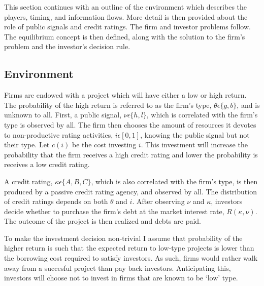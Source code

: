 \documentclass[notitlepage]{article}
\begin{document}
This section continues with an outline of the environment which describes the players, timing, and information flows. More detail is then provided about the role of public signals and credit ratings. The firm and investor problems follow. The equilibrium concept is then defined, along with the solution to the firm's problem and the investor's decision rule.

\subsection{Environment}
Firms are endowed with a project which will have either a low or high return. The probability of the high return is referred to as the firm's type, $\theta \epsilon \{g,b\}$, and is unknown to all. First, a public signal, $\nu \epsilon \{h,l\}$, which is correlated with the firm's type is observed by all. The firm then chooses the amount of resources it devotes to non-productive rating activities, $i  \epsilon [0,1]$, knowing the public signal but not their type. Let $c(i)$ be the cost investing $i$. This investment will increase the probability that the firm receives a high credit rating and lower the probability is receives a low credit rating.

A credit rating, $\kappa \epsilon \{A,B,C\}$, which is also correlated with the firm's type, is then produced by a passive credit rating agency, and observed by all. The distribution of credit ratings depends on both $\theta$ and $i$. After observing $\nu$ and $\kappa$, investors decide whether to purchase the firm's debt at the market interest rate, $R(\kappa,\nu)$. The outcome of the project is then realized and debts are paid.

To make the investment decision non-trivial I assume that probability of the higher return is such that the expected return to low-type projects is lower than the borrowing cost required to satisfy investors. As such, firms would rather walk away from a succesful project than pay back investors. Anticipating this, investors will choose not to invest in firms that are known to be `low' type.
\end{document}
